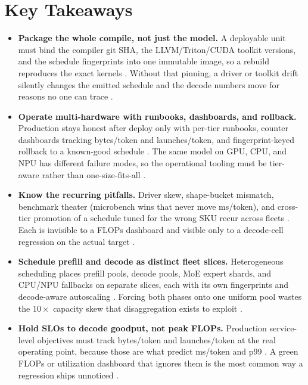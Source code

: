 \section{Key Takeaways}
\label{sec:ch26_key_takeaways}

\begin{itemize}
\item \textbf{Package the whole compile, not just the model.}
A deployable unit must bind the compiler git SHA, the LLVM/Triton/CUDA toolkit versions, and the schedule fingerprints into one immutable image, so a rebuild reproduces the exact kernels \citep{chen2020compilerbasedhardw,yirage2026}. Without that pinning, a driver or toolkit drift silently changes the emitted schedule and the decode numbers move for reasons no one can trace \citep{patel2025llminference,memoryfloor2026}.

\item \textbf{Operate multi-hardware with runbooks, dashboards, and rollback.}
Production stays honest after deploy only with per-tier runbooks, counter dashboards tracking bytes/token and launches/token, and fingerprint-keyed rollback to a known-good schedule \citep{patel2025llminference,yirage2026}. The same model on GPU, CPU, and NPU has different failure modes, so the operational tooling must be tier-aware rather than one-size-fits-all \citep{amd2024xdna,amd2024aie}.

\item \textbf{Know the recurring pitfalls.}
Driver skew, shape-bucket mismatch, benchmark theater (microbench wins that never move ms/token), and cross-tier promotion of a schedule tuned for the wrong SKU recur across fleets \citep{nvidia2024cudagraphs,taxbreak2026}. Each is invisible to a FLOPs dashboard and visible only to a decode-cell regression on the actual target \citep{memoryfloor2026,patel2025llminference}.

\item \textbf{Schedule prefill and decode as distinct fleet slices.}
Heterogeneous scheduling places prefill pools, decode pools, MoE expert shards, and CPU/NPU fallbacks on separate slices, each with its own fingerprints and decode-aware autoscaling \citep{patel2025llminference,kwon2023vllm}. Forcing both phases onto one uniform pool wastes the $10\times$ capacity skew that disaggregation exists to exploit \citep{liu2024deepseekv3,memoryfloor2026}.

\item \textbf{Hold SLOs to decode goodput, not peak FLOPs.}
Production service-level objectives must track bytes/token and launches/token at the real operating point, because those are what predict ms/token and p99 \citep{patel2025llminference,taxbreak2026}. A green FLOPs or utilization dashboard that ignores them is the most common way a regression ships unnoticed \citep{memoryfloor2026,dlbook}.
\end{itemize}

